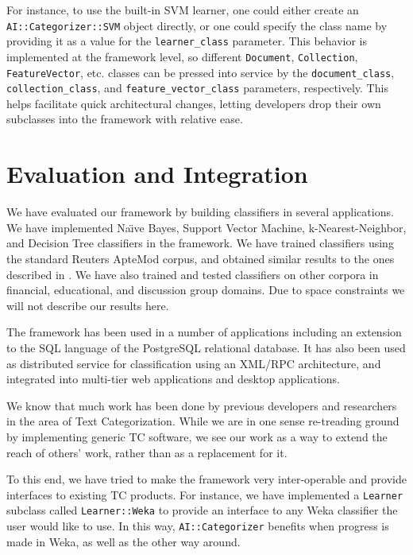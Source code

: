 \documentclass[twocolumn]{article}
\begin{document}
For instance, to use the built-in SVM learner, one could either create
an \texttt{AI::Categorizer::SVM} object directly, or one could specify
the class name by providing it as a value for the
\texttt{learner\_class} parameter.  This behavior is implemented at
the framework level, so different \texttt{Document},
\texttt{Collection}, \texttt{FeatureVector}, etc. classes can be
pressed into service by the \texttt{document\_class},
\texttt{collection\_class}, and \texttt{feature\_vector\_class}
parameters, respectively.  This helps facilitate quick architectural
changes, letting developers drop their own subclasses into the
framework with relative ease.


\section{Evaluation and Integration}

We have evaluated our framework by building classifiers in several
applications.  We have implemented Na\"\i ve Bayes, Support Vector
Machine, k-Nearest-Neighbor, and Decision Tree classifiers in the
framework.  We have trained classifiers using the standard Reuters
ApteMod corpus, and obtained similar results to the ones described in
\cite{yang:99}.  We have also trained and tested classifiers on other
corpora in financial, educational, and discussion group domains.  Due
to space constraints we will not describe our results here.

The framework has been used in a number of applications including an
extension to the SQL language of the PostgreSQL relational
database. It has also been used as distributed service for
classification using an XML/RPC architecture, and integrated into
multi-tier web applications and desktop applications.

We know that much work has been done by previous developers and
researchers in the area of Text Categorization.  While we are in one
sense re-treading ground by implementing generic TC software, we see
our work as a way to extend the reach of others' work, rather than as
a replacement for it.

To this end, we have tried to make the framework very inter-operable
and provide interfaces to existing TC products.  For instance, we have
implemented a \texttt{Learner} subclass called \texttt{Learner::Weka}
to provide an interface to any Weka classifier the user would like to
use.  In this way, \texttt{AI::Categorizer} benefits when progress is
made in Weka, as well as the other way around.
\end{document}
